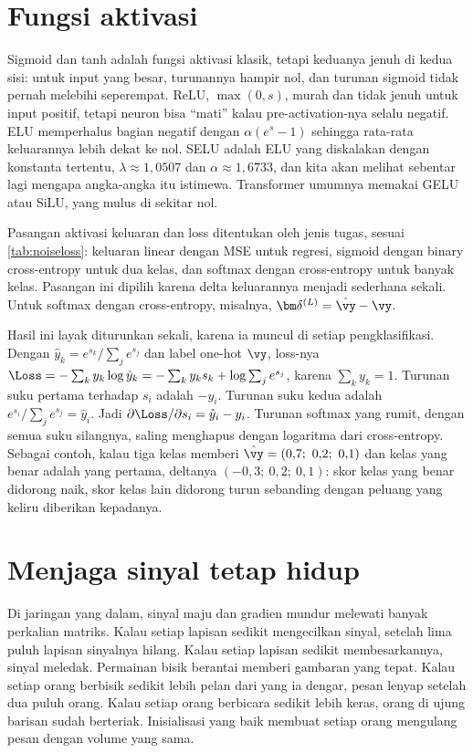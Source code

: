 \section{Fungsi aktivasi}

Sigmoid dan tanh adalah fungsi aktivasi klasik, tetapi keduanya jenuh di kedua sisi: untuk input
yang besar, turunannya hampir nol, dan turunan sigmoid tidak pernah melebihi seperempat. ReLU,
$\max(0,s)$, murah dan tidak jenuh untuk input positif, tetapi neuron bisa ``mati'' kalau
pre-activation-nya selalu negatif. ELU memperhalus bagian negatif dengan $\alpha(e^s-1)$ sehingga
rata-rata keluarannya lebih dekat ke nol. SELU adalah ELU yang diskalakan dengan konstanta
tertentu, $\lambda\approx1{,}0507$ dan $\alpha\approx1{,}6733$, dan kita akan melihat sebentar lagi
mengapa angka-angka itu istimewa. Transformer umumnya memakai GELU atau SiLU, yang mulus di
sekitar nol.

Pasangan aktivasi keluaran dan loss ditentukan oleh jenis tugas, sesuai \cref{tab:noiseloss}:
keluaran linear dengan MSE untuk regresi, sigmoid dengan binary cross-entropy untuk dua kelas,
dan softmax dengan cross-entropy untuk banyak kelas. Pasangan ini dipilih karena delta
keluarannya menjadi sederhana sekali. Untuk softmax dengan cross-entropy, misalnya,
$\bm\delta^{(L)}=\hat{\vy}-\vy$.

Hasil ini layak diturunkan sekali, karena ia muncul di setiap pengklasifikasi. Dengan
$\hat y_k=e^{s_k}/\sum_je^{s_j}$ dan label one-hot $\vy$, loss-nya
$\Loss=-\sum_ky_k\log\hat y_k=-\sum_ky_ks_k+\log\sum_je^{s_j}$, karena $\sum_ky_k=1$. Turunan suku pertama
terhadap $s_i$ adalah $-y_i$. Turunan suku kedua adalah $e^{s_i}/\sum_je^{s_j}=\hat y_i$. Jadi
$\partial\Loss/\partial s_i=\hat y_i-y_i$. Turunan softmax yang rumit, dengan semua suku silangnya, saling
menghapus dengan logaritma dari cross-entropy. Sebagai contoh, kalau tiga kelas memberi
$\hat{\vy}=(0{,}7;\ 0{,}2;\ 0{,}1)$ dan kelas yang benar adalah yang pertama, deltanya
$(-0{,}3;\ 0{,}2;\ 0{,}1)$: skor kelas yang benar didorong naik, skor kelas lain didorong turun
sebanding dengan peluang yang keliru diberikan kepadanya.

\section{Menjaga sinyal tetap hidup}

Di jaringan yang dalam, sinyal maju dan gradien mundur melewati banyak perkalian matriks. Kalau
setiap lapisan sedikit mengecilkan sinyal, setelah lima puluh lapisan sinyalnya hilang. Kalau
setiap lapisan sedikit membesarkannya, sinyal meledak. Permainan bisik berantai memberi
gambaran yang tepat. Kalau setiap orang berbisik sedikit lebih pelan dari yang ia dengar, pesan
lenyap setelah dua puluh orang. Kalau setiap orang berbicara sedikit lebih keras, orang di ujung
barisan sudah berteriak. Inisialisasi yang baik membuat setiap orang mengulang pesan dengan
volume yang sama.


